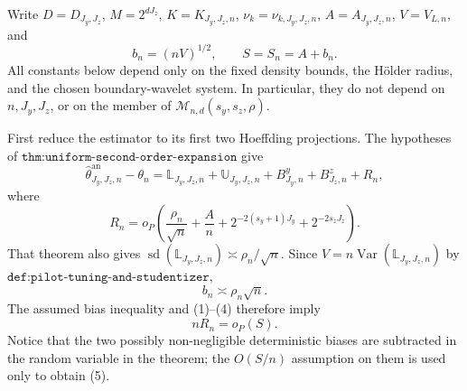 Write \(D=D_{J_y,J_z}\), \(M=2^{dJ_z}\), \(K=K_{J_y,J_z,n}\), \(\nu_k=\nu_{k,J_y,J_z,n}\), \(A=A_{J_y,J_z,n}\), \(V=V_{L,n}\), and
\[
b_n=(nV)^{1/2},\qquad S=S_n=A+b_n.
\tag{1}
\]
All constants below depend only on the fixed density bounds, the H\"older radius, and the chosen boundary-wavelet system.  In particular, they do not depend on \(n,J_y,J_z\), or on the member of \(\mathcal M_{n,d}(s_y,s_z,\rho)\).

First reduce the estimator to its first two Hoeffding projections.  The hypotheses of \(\texttt{thm:uniform-second-order-expansion}\) give
\[
\widehat\theta^{\mathrm{an}}_{J_y,J_z,n}-\theta_n
=\mathbb L_{J_y,J_z,n}+\mathbb U_{J_y,J_z,n}
+B^y_{J_y,n}+B^z_{J_z,n}+R_n,
\tag{2}
\]
where
\[
R_n=o_P\!\left(\frac{\rho_n}{\sqrt n}+\frac A n
+2^{-2(s_y+1)J_y}+2^{-2s_zJ_z}\right).
\tag{3}
\]
That theorem also gives \(\operatorname{sd}(\mathbb L_{J_y,J_z,n})\asymp\rho_n/\sqrt n\).  Since \(V=n\operatorname{Var}(\mathbb L_{J_y,J_z,n})\) by \(\texttt{def:pilot-tuning-and-studentizer}\),
\[
b_n\asymp \rho_n\sqrt n.
\tag{4}
\]
The assumed bias inequality and (1)--(4) therefore imply
\[
nR_n=o_P(S).
\tag{5}
\]
Notice that the two possibly non-negligible deterministic biases are subtracted in the random variable in the theorem; the \(O(S/n)\) assumption on them is used only to obtain (5).

